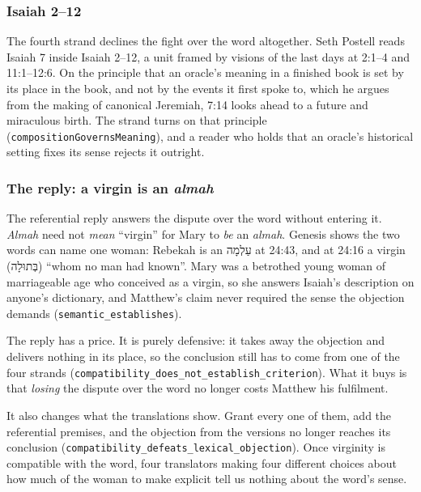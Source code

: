 \documentclass[11pt]{article}
\begin{document}
\subsubsection*{Isaiah 2–12}
The fourth strand declines the fight over the word altogether. Seth Postell reads Isaiah 7 inside Isaiah 2–12, a unit framed by visions of the last days at 2:1–4 and 11:1–12:6. On the principle that an oracle’s meaning in a finished book is set by its place in the book, and not by the events it first spoke to, which he argues from the making of canonical Jeremiah, 7:14 looks ahead to a future and miraculous birth. The strand turns on that principle (\texttt{composition\allowbreak{}Governs\allowbreak{}Meaning}), and a reader who holds that an oracle’s historical setting fixes its sense rejects it outright.

\subsubsection*{The reply: a virgin is an \emph{almah}}
The referential reply answers the dispute over the word without entering it. \emph{Almah} need not \emph{mean} “virgin” for Mary to \emph{be} an \emph{almah}. Genesis shows the two words can name one woman: Rebekah is an עַלְמָה at 24:43, and at 24:16 a virgin (בְּתוּלָה) “whom no man had known”. Mary was a betrothed young woman of marriageable age who conceived as a virgin, so she answers Isaiah’s description on anyone’s dictionary, and Matthew’s claim never required the sense the objection demands (\texttt{semantic\_\allowbreak{}establishes}).

The reply has a price. It is purely defensive: it takes away the objection and delivers nothing in its place, so the conclusion still has to come from one of the four strands (\texttt{compatibility\_\allowbreak{}does\_\allowbreak{}not\_\allowbreak{}establish\_\allowbreak{}criterion}). What it buys is that \emph{losing} the dispute over the word no longer costs Matthew his fulfilment.

It also changes what the translations show. Grant every one of them, add the referential premises, and the objection from the versions no longer reaches its conclusion (\texttt{compatibility\_\allowbreak{}defeats\_\allowbreak{}lexical\_\allowbreak{}objection}). Once virginity is compatible with the word, four translators making four different choices about how much of the woman to make explicit tell us nothing about the word’s sense.
\end{document}
